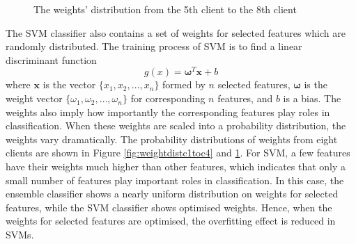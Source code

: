 \begin{figure}
\begin{center}
\end{center}
\caption{The weights' distribution from the 5th client to the 8th client}
\label{fig:weightdistc5toc8}
\end{figure}

The SVM classifier also contains a set of weights for selected features which are randomly distributed. The training process of SVM is to find a linear discriminant function
\begin{equation}
 g(x)=\mathbf{\omega}^T \mathbf{x} + b
\end{equation}
where $\mathbf{x}$ is the vector $\{x_1,x_2,\ldots,x_n\}$ formed by $n$ selected features, $\mathbf{\omega}$ is the weight vector $\{\omega_1,\omega_2,\ldots,\omega_n\}$ for corresponding $n$ features, and $b$ is a bias. The weights also imply how importantly the corresponding features play roles in classification. When these weights are scaled into a probability distribution, the weights vary dramatically. The probability distributions of weights from eight clients are shown in \mbox{Figure} \ref{fig:weightdistc1toc4} and \ref{fig:weightdistc5toc8}. For SVM, a few features have their weights much higher than other features, which indicates that only a small number of features play important roles in classification. In this case, the ensemble classifier shows a nearly uniform distribution on weights for selected features, while the SVM classifier shows optimised weights. Hence, when the weights for selected features are optimised, the overfitting effect is reduced in SVMs.

